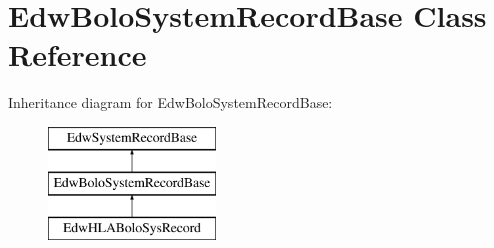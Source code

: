 \hypertarget{class_edw_bolo_system_record_base}{
\section{EdwBoloSystemRecordBase Class Reference}
\label{class_edw_bolo_system_record_base}
}
Inheritance diagram for EdwBoloSystemRecordBase:\begin{figure}[H]
\begin{center}
\leavevmode
\includegraphics[height=3cm]{class_edw_bolo_system_record_base}
\end{center}
\end{figure}
